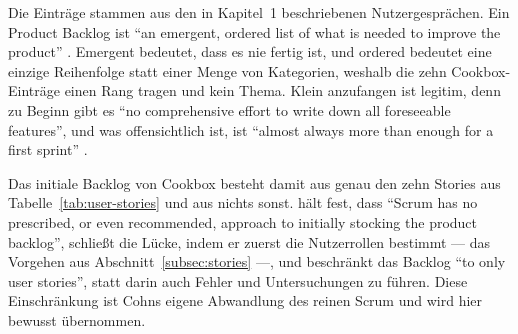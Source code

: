 %
%
%
Die Einträge stammen aus den in Kapitel~1 beschriebenen Nutzergesprächen. Ein
Product Backlog ist \enquote{an emergent, ordered list of what is needed to improve the
product} \parencite[p.~10]{scrumguide2020}. Emergent bedeutet, dass es nie
fertig ist, und ordered bedeutet eine einzige Reihenfolge statt einer Menge von
Kategorien, weshalb die zehn Cookbox-Einträge einen Rang tragen und kein Thema.
Klein anzufangen ist legitim, denn zu Beginn gibt es
\enquote{no comprehensive effort to write down all foreseeable features}, und was
offensichtlich ist, ist \enquote{almost always more than enough for a first sprint}
\parencite[p.~167]{cohn2004}.

Das initiale Backlog von Cookbox besteht damit aus genau den zehn Stories aus
Tabelle~\ref{tab:user-stories} und aus nichts sonst. \textcite[p.~173]{cohn2004} hält
fest, dass \enquote{Scrum has no prescribed, or even recommended, approach to initially
stocking the product backlog}, schließt die Lücke, indem er zuerst die
Nutzerrollen bestimmt --- das Vorgehen aus Abschnitt~\ref{subsec:stories} ---, und
beschränkt das Backlog \enquote{to only user stories}, statt darin auch Fehler und
Untersuchungen zu führen. Diese Einschränkung ist Cohns eigene Abwandlung des reinen Scrum und wird
hier bewusst übernommen.

